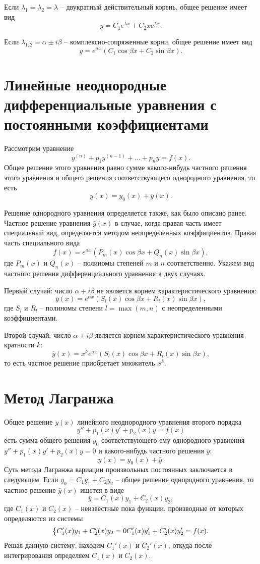 \documentclass[a5paper, 11pt]{extbook}
\theoremstyle{definition}
\theoremstyle{definition}
\begin{document}
Если \(\lambda_1 = \lambda_2 = \lambda\) -- двукратный действительный корень, общее решение имеет вид
\[
    y = C_1 e^{\lambda x} + C_2 x e^{\lambda x}.
\]

Если \(\lambda_{1, 2} = \alpha \pm i \beta\) -- комплексно-сопряженные корни, общее решение имеет вид
\[
    y = e^{\alpha x} (C_1 \cos \beta x + C_2 \sin \beta x).
\]

\section{Линейные неоднородные дифференциальные уравнения с постоянными коэффициентами}

Рассмотрим уравнение
\[
    y^{(n)} + p_1 y^{(n - 1)} + \ldots + p_n y = f(x).
\]
Общее решение этого уравнения равно сумме какого-нибудь частного решения этого уравнения и общего решения соответствующего однородного уравнения, то есть
\[
    y(x) = y_0(x) + \bar{y}(x).
\]

Решение однородного уравнения определяется также, как было описано ранее. Частное решение уравнения \(\bar{y}(x)\) в случае, когда правая часть имеет специальный вид, определяется методом неопределенных коэффициентов. Правая часть специального вида
\[
    f(x) = e^{\alpha x} (P_m(x) \cos \beta x + Q_n(x) \sin \beta x),
\]
где \(P_m(x)\) и \(Q_n(x)\) -- полиномы степеней \(m\) и \(n\) соответственно. Укажем вид частного решения дифференциального уравнения в двух случаях.

Первый случай: число \(\alpha + i \beta\) не является корнем характеристического уравнения:
\[
    \bar{y}(x) = e^{\alpha x} (S_l(x) \cos \beta x + R_l(x) \sin \beta x),
\]
где \(S_l\) и \(R_l\) -- полиномы степени \(l = \max(m, n)\) с неопределенными коэффициентами.

Второй случай: число \(\alpha + i \beta\) является корнем характеристического уравнения кратности \(k\):
\[
    \bar{y}(x) = x^k e^{\alpha x} (S_l(x) \cos \beta x + R_l(x) \sin \beta x),
\]
то есть частное решение приобретает множитель \(x^k\).

\section{Метод Лагранжа}

Общее решение \(y(x)\) линейного неоднородного уравнения второго порядка
\[
    y'' + p_1(x)y' + p_2(x)y = f(x)
\]
есть сумма общего решения \(y_0\) соответствующего ему однородного уравнения \(y'' + p_1(x)y' + p_2(x)y = 0\) и какого-нибудь частного решения \(\bar{y}\):
\[
    y(x) = y_0(x) + \bar{y}.
\]
Суть метода Лагранжа вариации произвольных постоянных заключается в следующем. Если \(y_0 = C_1 y_1 + C_2 y_2\) -- общее решение однородного уравнения, то частное решение \(\bar{y}(x)\) ищется в виде
\[
    \bar{y} = C_1(x) y_1 + C_2(x) y_2,
\]
где \(C_1(x)\) и \(C_2(x)\) -- неизвестные пока функции, производные от которых определяются из системы
\[
    \begin{dcases}
        C_1'(x) y_1 + C_2'(x)y_2 = 0
        C_1'(x) y_1' + C_2'(x)y_2' = f(x).
    \end{dcases}
\]
Решая данную систему, находим \(C_1'(x)\) и \(C_2'(x)\), откуда после интегрирования определяем \(C_1(x)\) и \(C_2(x)\).
\end{document}
